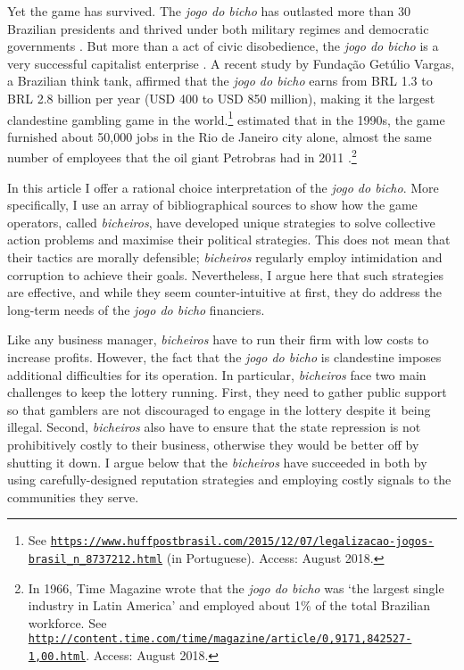 \documentclass[a4paper,12pt]{article}
\begin{document}
Yet the game has survived. The \textit{jogo do bicho} has outlasted more than 30 Brazilian presidents and thrived under both military regimes and democratic governments \citep{jupiara2015poroes}. But more than a act of civic disobedience, the \textit{jogo do bicho} is a very successful capitalist enterprise \citep{labronici2014sorteio, magalhaes2005ganhou}. A recent study by Fundação Getúlio Vargas, a Brazilian think tank, affirmed that the \textit{jogo do bicho} earns from BRL 1.3 to BRL 2.8 billion per year (USD 400 to USD 850 million), making it the largest clandestine gambling game in the world.\footnote{See \href{https://www.huffpostbrasil.com/2015/12/07/legalizacao-jogos-brasil_n_8737212.html}{\texttt{https://www.huffpostbrasil.com/2015/12/07/legalizacao-jogos-brasil\_n\_8737212.html}} (in Portuguese). Access: August 2018.} \citet[171]{schneider1996brazil} estimated that in the 1990s, the game furnished about 50,000 jobs in the Rio de Janeiro city alone, almost the same number of employees that the oil giant Petrobras had in 2011 \citep{exame2013petrobras}.\footnote{In 1966, Time Magazine wrote that the \textit{jogo do bicho} was `the largest single industry in Latin America' and employed about 1\% of the total Brazilian workforce. See \href{http://content.time.com/time/magazine/article/0,9171,842527-1,00.html}{\texttt{http://content.time.com/time/magazine/article/0,9171,842527-1,00.html}}. Access: August 2018.}

In this article I offer a rational choice interpretation of the \textit{jogo do bicho}. More specifically, I use an array of bibliographical sources to show how the game operators, called \textit{bicheiros}, have developed unique strategies to solve collective action problems and maximise their political strategies. This does not mean that their tactics are morally defensible; \textit{bicheiros} regularly employ intimidation and corruption to achieve their goals. Nevertheless, I argue here that such strategies are effective, and while they seem counter-intuitive at first, they do address the long-term needs of the \textit{jogo do bicho} financiers. 

Like any business manager, \textit{bicheiros} have to run their firm with low costs to increase profits. However, the fact that the \textit{jogo do bicho} is clandestine imposes additional difficulties for its operation. In particular,  \textit{bicheiros} face two main challenges to keep the lottery running. First, they need to gather public support so that gamblers are not discouraged to engage in the lottery despite it being illegal. Second, \textit{bicheiros} also have to ensure that the state repression is not prohibitively costly to their business, otherwise they would be better off by shutting it down. I argue below that the \textit{bicheiros} have succeeded in both by using carefully-designed reputation strategies and employing costly signals to the communities they serve. 
\end{document}
